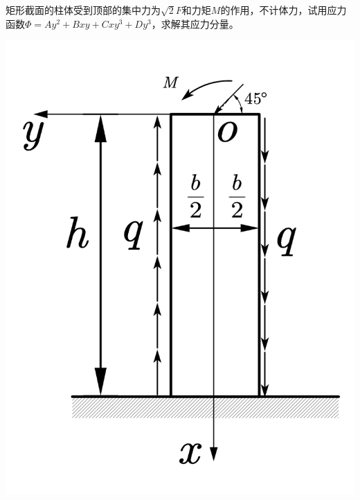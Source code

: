 \begin{example}
	矩形截面的柱体受到顶部的集中力为$\sqrt{2}F$和力矩$M$的作用，不计体力，试用应力函数$\varPhi =Ay^2+Bxy+Cxy^3+Dy^3$，求解其应力分量。
\end{example}
\centerline{\includegraphics[scale=0.6]{figure/3-10.png}}
